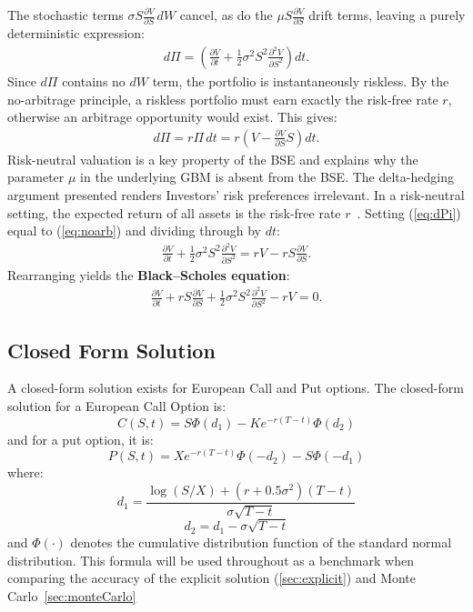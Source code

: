 \documentclass[11pt]{report}
\begin{document}
The stochastic terms $\sigma S \frac{\partial V}{\partial S}\,dW$ cancel, 
as do the $\mu S \frac{\partial V}{\partial S}$ drift terms, leaving a 
purely deterministic expression:
\begin{align}
    d\Pi = \left(\frac{\partial V}{\partial t} 
             + \frac{1}{2}\sigma^2 S^2 \frac{\partial^{2} V}{\partial S^2}
           \right)dt. \label{eq:dPi}
\end{align}
Since $d\Pi$ contains no $dW$ term, the portfolio is instantaneously 
riskless. By the no-arbitrage principle, a riskless portfolio must earn 
exactly the risk-free rate $r$, otherwise an arbitrage opportunity would 
exist. This gives:
\begin{align}
    d\Pi = r\Pi\,dt = r\left(V - \frac{\partial V}{\partial S}S\right)dt.
    \label{eq:noarb}
\end{align}
Risk-neutral valuation is a key property of the BSE and explains why the parameter 
$\mu$ in the underlying GBM is absent from the BSE.
The delta-hedging argument presented renders 
Investors' risk preferences irrelevant.
In a risk-neutral setting, the expected return of all 
assets is the risk-free rate $r$~\cite{alma991008589012108046}.
Setting (\ref{eq:dPi}) equal to (\ref{eq:noarb}) and dividing through 
by $dt$:
\begin{align}
    \frac{\partial V}{\partial t} 
    + \frac{1}{2}\sigma^2 S^2 \frac{\partial^{2} V}{\partial S^2}
    = r V - rS\frac{\partial V}{\partial S}.
\end{align}
Rearranging yields the \textbf{Black--Scholes equation}:
\begin{align}
    \frac{\partial V}{\partial t} 
    + rS\frac{\partial V}{\partial S}
    + \frac{1}{2}\sigma^2 S^2 \frac{\partial^{2} V}{\partial S^2}
    - rV = 0. \label{eq:BSE}
\end{align}

\subsection{Closed Form Solution}
A closed-form solution exists for European Call and Put options. The closed-form solution for a European Call Option is:
\begin{equation}
  C(S,t) = S\Phi(d_1) - Ke^{-r(T-t)}\Phi(d_2)
\end{equation}
and for a put option, it is:
\begin{equation}
    P(S,t) = Xe^{-r(T-t)}\Phi(-d_2) - S\Phi(-d_1)
\end{equation}
where:
\begin{equation}
    d_1 = \frac{\log(S/X) + (r + 0.5 \sigma^2)(T-t)}{\sigma \sqrt{T-t}}
\end{equation}
\begin{equation}
    d_2 = d_1 - \sigma \sqrt{T - t}
\end{equation}
and $\Phi(\cdot)$ denotes the cumulative distribution function of the standard normal distribution.
This formula will be used throughout as a benchmark when comparing
the accuracy of the explicit solution (\ref{sec:explicit}) and Monte Carlo~\ref{sec:monteCarlo}
\end{document}
